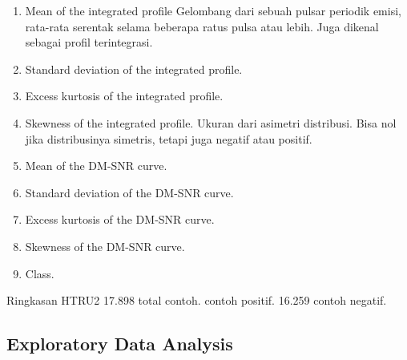 \documentclass[12pt]{article}
\begin{document}
    \begin{enumerate}
    
        \item Mean of the integrated profile
        \newline
        Gelombang dari sebuah pulsar periodik emisi, rata-rata serentak selama beberapa ratus pulsa atau lebih. Juga dikenal sebagai profil terintegrasi.
        
        \item Standard deviation of the integrated profile.
        \item Excess kurtosis of the integrated profile.
        \item Skewness of the integrated profile.
        \newline
        Ukuran dari asimetri distribusi. Bisa nol jika distribusinya simetris, tetapi juga negatif atau positif.
        
        \item Mean of the DM-SNR curve.
        \item Standard deviation of the DM-SNR curve.
        \item Excess kurtosis of the DM-SNR curve.
        \item Skewness of the DM-SNR curve.
        \item Class.
        
    \end{enumerate}
    
    Ringkasan HTRU2 17.898 total contoh.
     contoh positif. 16.259 contoh negatif.
    \newline
    
    \newpage
    
    \subsection{Exploratory Data Analysis}
    
\end{document}
